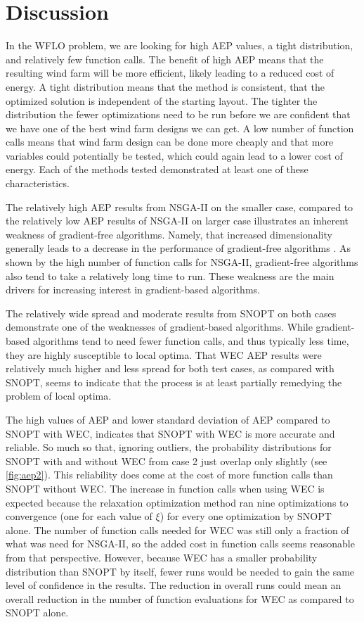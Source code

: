 \documentclass[a4paper]{jpconf}
\begin{document}
\section{Discussion}
In the WFLO problem, we are looking for high AEP values, a tight distribution, and relatively few function calls. The benefit of high AEP means that the resulting wind farm will be more efficient, likely leading to a reduced cost of energy. A tight distribution means that the method is consistent, that the optimized solution is independent of the starting layout. The tighter the distribution the fewer optimizations need to be run before we are confident that we have one of the best wind farm designs we can get. A low number of function calls means that wind farm design can be done more cheaply and that more variables could potentially be tested, which could again lead to a lower cost of energy. Each of the methods tested demonstrated at least one of these characteristics.

The relatively high AEP results from NSGA-II on the smaller case, compared to the relatively low AEP results of NSGA-II on larger case illustrates an inherent weakness of gradient-free algorithms. Namely, that increased dimensionality generally leads to a decrease in the performance of gradient-free algorithms \cite{rios2013-grad-free-comparison}. As shown by the high number of function calls for NSGA-II, gradient-free algorithms also tend to take a relatively long time to run. These weakness are the main drivers for increasing interest in gradient-based algorithms.

The relatively wide spread and moderate results from SNOPT on both cases demonstrate one of the weaknesses of gradient-based algorithms. While gradient-based algorithms tend to need fewer function calls, and thus typically less time, they are highly susceptible to local optima. That WEC AEP results were relatively much higher and less spread for both test cases, as compared with SNOPT, seems to indicate that the process is at least partially remedying the problem of local optima.

The high values of AEP and lower standard deviation of AEP compared to SNOPT with WEC, indicates that SNOPT with WEC is more accurate and reliable. So much so that, ignoring outliers, the probability distributions for SNOPT with and without WEC from case 2 just overlap only slightly (see \cref{fig:aep2}). This reliability does come at the cost of more function calls than SNOPT without WEC. The increase in function calls when using WEC is expected because the relaxation optimization method ran nine optimizations to convergence (one for each value of $\xi$) for every one optimization by SNOPT alone. The number of function calls needed for WEC was still only a fraction of what was need for NSGA-II, so the added cost in function calls seems reasonable from that perspective. However, because WEC has a smaller probability distribution than SNOPT by itself, fewer runs would be needed to gain the same level of confidence in the results. The reduction in overall runs could mean an overall reduction in the number of function evaluations for WEC as compared to SNOPT alone.
\end{document}
